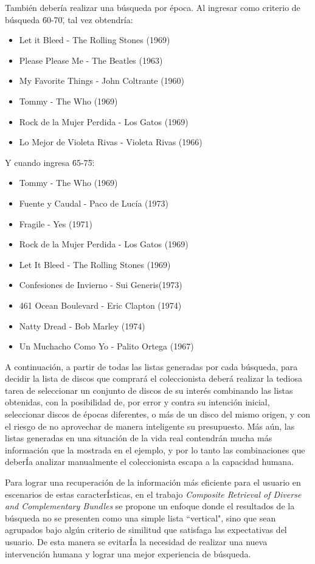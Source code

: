 También debería realizar una búsqueda por época. Al ingresar como criterio de búsqueda \"60-70\", tal vez obtendría:
\begin{itemize}
	\item Let it Bleed - The Rolling Stones (1969)
	\item Please Please Me - The Beatles (1963)
	\item My Favorite Things - John Coltrante (1960)
	\item Tommy - The Who (1969)
	\item Rock de la Mujer Perdida - Los Gatos (1969)
	\item Lo Mejor de Violeta Rivas - Violeta Rivas (1966)
\end{itemize}

Y cuando ingresa \"65-75\":
\begin{itemize}
	\item Tommy - The Who (1969)
	\item Fuente y Caudal - Paco de Lucía (1973)
	\item Fragile - Yes (1971)
	\item Rock de la Mujer Perdida - Los Gatos (1969)
	\item Let It Bleed - The Rolling Stones (1969)
	\item Confesiones de Invierno - Sui Generis(1973)
	\item 461 Ocean Boulevard - Eric Clapton (1974)
	\item Natty Dread - Bob Marley (1974)
	\item Un Muchacho Como Yo - Palito Ortega (1967)
\end{itemize}


A continuación, a partir de todas las listas generadas por cada búsqueda, para decidir la lista de discos que comprará el coleccionista deberá realizar la tediosa tarea de seleccionar un conjunto de discos de su interés combinando las listas obtenidas, con la posibilidad de, por error y contra su intención inicial, seleccionar discos de  épocas diferentes, o más de un disco del mismo origen, y con el riesgo de no aprovechar de manera inteligente su presupuesto. Más aún, las listas generadas en una situación de la vida real contendrán mucha más información que la mostrada en el ejemplo, y por lo tanto las combinaciones que deberÍa analizar manualmente el coleccionista escapa a la capacidad humana. 

Para lograr una recuperación de la información más eficiente para el usuario en escenarios de estas caracterÍsticas, en el trabajo {\em Composite Retrieval of Diverse and Complementary Bundles} \cite{compositeRetrival} se propone un enfoque donde el resultados de la búsqueda no se presenten como una simple lista ``vertical", sino que sean agrupados bajo algún criterio de similitud que satisfaga las expectativas del usuario. De esta manera se evitarÍa la necesidad de realizar una nueva intervención humana y lograr una mejor experiencia de búsqueda.

